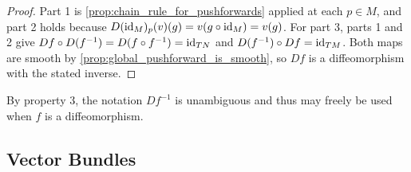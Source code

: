 \documentclass[a4paper,12pt]{article}
\begin{document}
\begin{proof}
    Part 1 is \cref{prop:chain_rule_for_pushforwards} applied at each $p \in M$, and part 2 holds because $D(\operatorname{id}_M)_p(v)(g) = v(g \circ \operatorname{id}_M) = v(g)$.
    For part 3, parts 1 and 2 give $Df \circ D(f^{-1}) = D(f \circ f^{-1}) = \operatorname{id}_{TN}$ and $D(f^{-1}) \circ Df = \operatorname{id}_{TM}$.
    Both maps are smooth by \cref{prop:global_pushforward_is_smooth}, so $Df$ is a diffeomorphism with the stated inverse.
\end{proof}
\begin{remark}
    By property 3, the notation $Df^{-1}$ is unambiguous and thus may freely be used when $f$ is a diffeomorphism.
\end{remark}

\subsection{Vector Bundles}\label{subsec:manifolds:vector_bundles}
\end{document}
